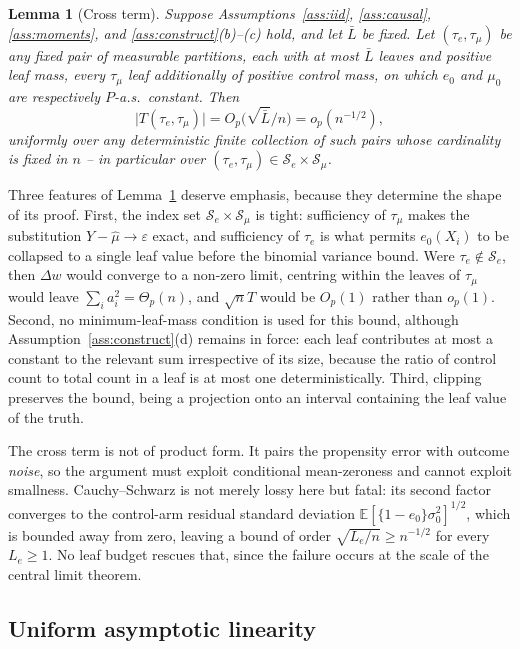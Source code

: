 \documentclass[11pt]{article}
\theoremstyle{plain}
\newtheorem{lemma}[theorem]{Lemma}
\theoremstyle{definition}
\theoremstyle{remark}
\newcommand{\E}{\mathbb{E}}
\newcommand{\cS}{\mathcal{S}}
\newcommand{\ez}{e_0}
\newcommand{\mz}{\mu_0}
\newcommand{\mhat}{\widehat{\mu}}
\begin{document}
\begin{lemma}[Cross term]\label{lem:cross}
Suppose Assumptions~\ref{ass:iid}, \ref{ass:causal}, \ref{ass:moments}, and
\ref{ass:construct}(b)--(c) hold, and let $\bar L$ be fixed. Let
$(\tau_e,\tau_\mu)$ be any fixed pair of measurable partitions, each with at
most $\bar L$ leaves and positive leaf mass, every $\tau_\mu$ leaf
additionally of positive control mass, on which $\ez$ and $\mz$ are
respectively $P$-a.s.\ constant. Then
\[
  \bigl\lvert T(\tau_e,\tau_\mu)\bigr\rvert
  =O_p\bigl(\sqrt{\bar L}/n\bigr)=o_p(n^{-1/2}),
\]
uniformly over any deterministic finite collection of such pairs whose
cardinality is fixed in $n$ -- in particular over
$(\tau_e,\tau_\mu)\in\cS_e\times\cS_\mu$.
\end{lemma}

\noindent Three features of Lemma~\ref{lem:cross} deserve emphasis, because they
determine the shape of its proof. First, the index set
$\cS_e\times\cS_\mu$ is tight: sufficiency of $\tau_\mu$ makes the substitution
$Y-\mhat\to\varepsilon$ exact, and sufficiency of $\tau_e$ is what permits
$\ez(X_i)$ to be collapsed to a single leaf value before the binomial variance
bound. Were $\tau_e\notin\cS_e$, then $\Delta w$ would converge to a non-zero
limit, centring within the leaves of $\tau_\mu$ would leave
$\sum_ia_i^2=\Theta_p(n)$, and $\sqrt nT$ would be $O_p(1)$ rather than
$o_p(1)$. Second, no minimum-leaf-mass condition is used for this bound, although
Assumption~\ref{ass:construct}(d) remains in force: each
leaf contributes at most a constant to the relevant sum irrespective of its
size, because the ratio of control count to total count in a leaf is at most one
deterministically. Third, clipping preserves the bound, being a projection onto
an interval containing the leaf value of the truth.

The cross term is not of product form. It pairs the propensity error with
outcome \emph{noise}, so the argument must exploit conditional mean-zeroness and
cannot exploit smallness. Cauchy--Schwarz is not merely lossy here but fatal:
its second factor converges to the control-arm residual standard deviation
$\E[\{1-\ez\}\sigma_0^2]^{1/2}$, which is bounded away from zero, leaving a
bound of order $\sqrt{L_e/n}\ge n^{-1/2}$ for every $L_e\ge1$. No leaf budget
rescues that, since the failure occurs at the scale of the central limit
theorem.

\subsection{Uniform asymptotic linearity}
\end{document}

